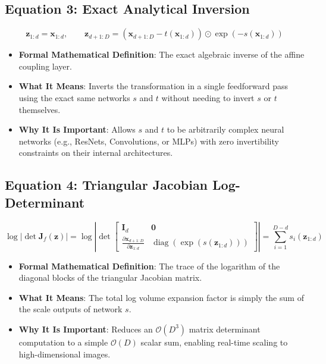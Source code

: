\documentclass[11pt,a4paper]{article}
\theoremstyle{definition}
\begin{document}
\subsection{\textbf{Equation 3: Exact Analytical Inversion}}
{\boldmath
\begin{equation}
\mathbf{z}_{1:d} = \mathbf{x}_{1:d}, \qquad \mathbf{z}_{d+1:D} = (\mathbf{x}_{d+1:D} - t(\mathbf{x}_{1:d})) \odot \exp(-s(\mathbf{x}_{1:d}))
\end{equation}
}
\begin{itemize}
    \item \textbf{Formal Mathematical Definition}:
    The exact algebraic inverse of the affine coupling layer.
    \item \textbf{What It Means}:
    Inverts the transformation in a single feedforward pass using the exact same networks $s$ and $t$ without needing to invert $s$ or $t$ themselves.
    \item \textbf{Why It Is Important}:
    Allows $s$ and $t$ to be arbitrarily complex neural networks (e.g., ResNets, Convolutions, or MLPs) with zero invertibility constraints on their internal architectures.
\end{itemize}

\subsection{\textbf{Equation 4: Triangular Jacobian Log-Determinant}}
{\boldmath
\begin{equation}
\log \left| \det \mathbf{J}_f(\mathbf{z}) \right| = \log \left| \det \begin{bmatrix} \mathbf{I}_d & \mathbf{0} \\ \frac{\partial \mathbf{x}_{d+1:D}}{\partial \mathbf{z}_{1:d}} & \operatorname{diag}(\exp(s(\mathbf{z}_{1:d}))) \end{bmatrix} \right| = \sum_{i=1}^{D-d} s_i(\mathbf{z}_{1:d})
\end{equation}
}
\begin{itemize}
    \item \textbf{Formal Mathematical Definition}:
    The trace of the logarithm of the diagonal blocks of the triangular Jacobian matrix.
    \item \textbf{What It Means}:
    The total log volume expansion factor is simply the sum of the scale outputs of network $s$.
    \item \textbf{Why It Is Important}:
    Reduces an $\mathcal{O}(D^3)$ matrix determinant computation to a simple $\mathcal{O}(D)$ scalar sum, enabling real-time scaling to high-dimensional images.
\end{itemize}
\end{document}
